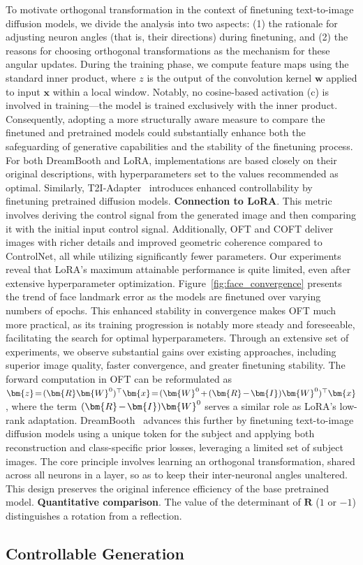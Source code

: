 To motivate orthogonal transformation in the context of finetuning text-to-image diffusion models, we divide the analysis into two aspects: (1) the rationale for adjusting neuron angles (that is, their directions) during finetuning, and (2) the reasons for choosing orthogonal transformations as the mechanism for these angular updates. During the training phase, we compute feature maps using the standard inner product, where $z$ is the output of the convolution kernel $\bm{w}$ applied to input $\bm{x}$ within a local window. Notably, no cosine-based activation (c) is involved in training—the model is trained exclusively with the inner product. Consequently, adopting a more structurally aware measure to compare the finetuned and pretrained models could substantially enhance both the safeguarding of generative capabilities and the stability of the finetuning process. For both DreamBooth and LoRA, implementations are based closely on their original descriptions, with hyperparameters set to the values recommended as optimal. Similarly, T2I-Adapter~\cite{mou2023t2i} introduces enhanced controllability by finetuning pretrained diffusion models. \textbf{Connection to LoRA}. This metric involves deriving the control signal from the generated image and then comparing it with the initial input control signal. Additionally, OFT and COFT deliver images with richer details and improved geometric coherence compared to ControlNet, all while utilizing significantly fewer parameters. Our experiments reveal that LoRA’s maximum attainable performance is quite limited, even after extensive hyperparameter optimization. Figure~\ref{fig:face_convergence} presents the trend of face landmark error as the models are finetuned over varying numbers of epochs. This enhanced stability in convergence makes OFT much more practical, as its training progression is notably more steady and foreseeable, facilitating the search for optimal hyperparameters. Through an extensive set of experiments, we observe substantial gains over existing approaches, including superior image quality, faster convergence, and greater finetuning stability. The forward computation in OFT can be reformulated as $\thickmuskip=2mu \medmuskip=2mu \bm{z}=(\bm{R}\bm{W}^0)^\top\bm{x}=(\bm{W}^0+(\bm{R}-\bm{I})\bm{W}^0)^\top\bm{x}$, where the term $\thickmuskip=2mu \medmuskip=2mu (\bm{R}-\bm{I})\bm{W}^0$ serves a similar role as LoRA’s low-rank adaptation. DreamBooth~\cite{ruiz2023dreambooth} advances this further by finetuning text-to-image diffusion models using a unique token for the subject and applying both reconstruction and class-specific prior losses, leveraging a limited set of subject images. The core principle involves learning an orthogonal transformation, shared across all neurons in a layer, so as to keep their inter-neuronal angles unaltered. This design preserves the original inference efficiency of the base pretrained model. \textbf{Quantitative comparison}. The value of the determinant of $\bm{R}$ ($1$ or $-1$) distinguishes a rotation from a reflection. \subsection{Controllable Generation}

